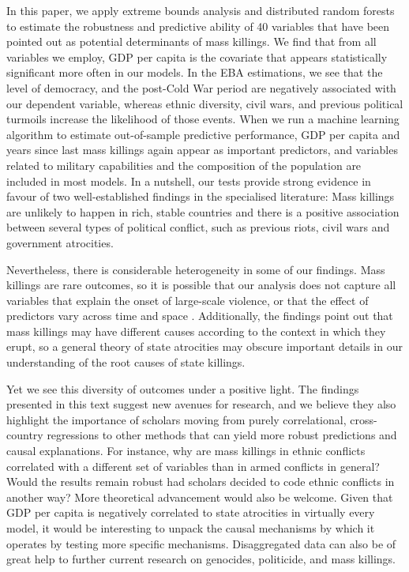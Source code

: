 In this paper, we apply extreme bounds analysis and distributed random forests to estimate the robustness and predictive ability of 40 variables that have been pointed out as potential determinants of mass killings. We find that from all variables we employ, GDP per capita is the covariate that appears statistically significant more often in our models. In the EBA estimations, we see that the level of democracy, and the post-Cold War period are negatively associated with our dependent variable, whereas ethnic diversity, civil wars, and previous political turmoils increase the likelihood of those events. When we run a machine learning algorithm to estimate out-of-sample predictive performance, GDP per capita and years since last mass killings again appear as important predictors, and variables related to military capabilities and the composition of the population are included in most models. In a nutshell, our tests provide strong evidence in favour of two well-established findings in the specialised literature: Mass killings are unlikely to happen in rich, stable countries and there is a positive association between several types of political conflict, such as previous riots, civil wars and government atrocities.

Nevertheless, there is considerable heterogeneity in some of our findings. Mass killings are rare outcomes, so it is possible that our analysis does not capture all variables that explain the onset of large-scale violence, or that the effect of predictors vary across time and space \citep[8]{bell2015examining}. Additionally, the findings point out that mass killings may have different causes according to the context in which they erupt, so a general theory of state atrocities may obscure important details in our understanding of the root causes of state killings. 

Yet we see this diversity of outcomes under a positive light. The findings presented in this text suggest new avenues for research, and we believe they also highlight the importance of scholars moving from purely correlational, cross-country regressions to other methods that can yield more robust predictions and causal explanations. For instance, why are mass killings in ethnic conflicts correlated with a different set of variables than in armed conflicts in general? Would the results remain robust had scholars decided to code ethnic conflicts in another way? More theoretical advancement would also be welcome. Given that GDP per capita is negatively correlated to state atrocities in virtually every model, it would be interesting to unpack the causal mechanisms by which it operates by testing more specific mechanisms. Disaggregated data can also be of great help to further current research on genocides, politicide, and mass killings.

